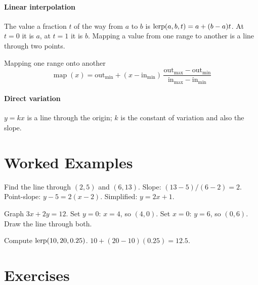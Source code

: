 \paragraph{Linear interpolation} The value a fraction $t$ of the way from $a$ to $b$ is $\operatorname{lerp}(a, b, t) = a + (b - a)t$. At $t = 0$ it is $a$, at $t = 1$ it is $b$. Mapping a value from one range to another is a line through two points.

\begin{keybox}{Mapping one range onto another}
\[
\operatorname{map}(x) = \text{out}_{\min} + (x - \text{in}_{\min})\,\frac{\text{out}_{\max} - \text{out}_{\min}}{\text{in}_{\max} - \text{in}_{\min}}
\]
\end{keybox}

\paragraph{Direct variation} $y = kx$ is a line through the origin; $k$ is the constant of variation and also the slope.

\section{Worked Examples}

\begin{example}
Find the line through $(2, 5)$ and $(6, 13)$.
\solution Slope: $(13 - 5)/(6 - 2) = 2$. Point-slope: $y - 5 = 2(x - 2)$. Simplified: $y = 2x + 1$.
\end{example}

\begin{example}
Graph $3x + 2y = 12$.
\solution Set $y = 0$: $x = 4$, so $(4, 0)$. Set $x = 0$: $y = 6$, so $(0, 6)$. Draw the line through both.
\end{example}

\begin{example}
Compute $\operatorname{lerp}(10, 20, 0.25)$.
\solution $10 + (20 - 10)(0.25) = 12.5$.
\end{example}

\section{Exercises}

